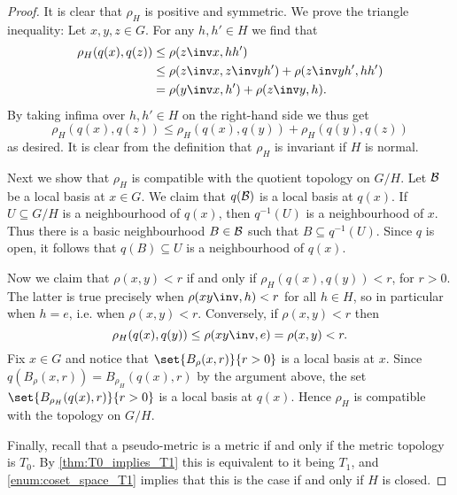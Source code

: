 \documentclass[article, a4paper, 11pt, oneside]{memoir}
\numberwithin{equation}{chapter}
\newcommand{\preim}{^{-1}}
\begin{document}
\begin{proof}
    It is clear that $\rho_H$ is positive and symmetric. We prove the triangle inequality: Let $x,y,z \in G$. For any $h, h' \in H$ we find that
    \begin{align*}
        \rho_H(q(x), q(z))
            &\leq \rho(z\inv x, hh') \\
            &\leq \rho(z\inv x, z\inv yh') + \rho(z\inv yh', hh') \\
            &= \rho(y\inv x, h') + \rho(z\inv y, h).
    \end{align*}
    By taking infima over $h,h' \in H$ on the right-hand side we thus get
    \begin{equation*}
        \rho_H(q(x),q(z))
            \leq \rho_H(q(x),q(y)) + \rho_H(q(y),q(z))
    \end{equation*}
    as desired. It is clear from the definition that $\rho_H$ is invariant if $H$ is normal.

    Next we show that $\rho_H$ is compatible with the quotient topology on $G/H$. Let $\mathcal{B}$ be a local basis at $x \in G$. We claim that $q(\mathcal{B})$ is a local basis at $q(x)$. If $U \subseteq G/H$ is a neighbourhood of $q(x)$, then $q\preim(U)$ is a neighbourhood of $x$. Thus there is a basic neighbourhood $B \in \mathcal{B}$ such that $B \subseteq q\preim(U)$. Since $q$ is open, it follows that $q(B) \subseteq U$ is a neighbourhood of $q(x)$.

    Now we claim that $\rho(x,y) < r$ if and only if $\rho_H(q(x),q(y)) < r$, for $r > 0$. The latter is true precisely when $\rho(xy\inv, h) < r$ for all $h \in H$, so in particular when $h = e$, i.e. when $\rho(x,y) < r$. Conversely, if $\rho(x,y) < r$ then
    \begin{equation*}
        \rho_H(q(x),q(y))
            \leq \rho(xy\inv, e)
            = \rho(x,y)
            < r.
    \end{equation*}
    Fix $x \in G$ and notice that $\set{B_\rho(x,r)}{r > 0}$ is a local basis at $x$. Since $q(B_\rho(x,r)) = B_{\rho_H}(q(x),r)$ by the argument above, the set $\set{B_{\rho_H}(q(x),r)}{r > 0}$ is a local basis at $q(x)$. Hence $\rho_H$ is compatible with the topology on $G/H$.

    Finally, recall that a pseudo-metric is a metric if and only if the metric topology is $T_0$. By \cref{thm:T0_implies_T1} this is equivalent to it being $T_1$, and \cref{enum:coset_space_T1} implies that this is the case if and only if $H$ is closed.
\end{proof}
\end{document}

